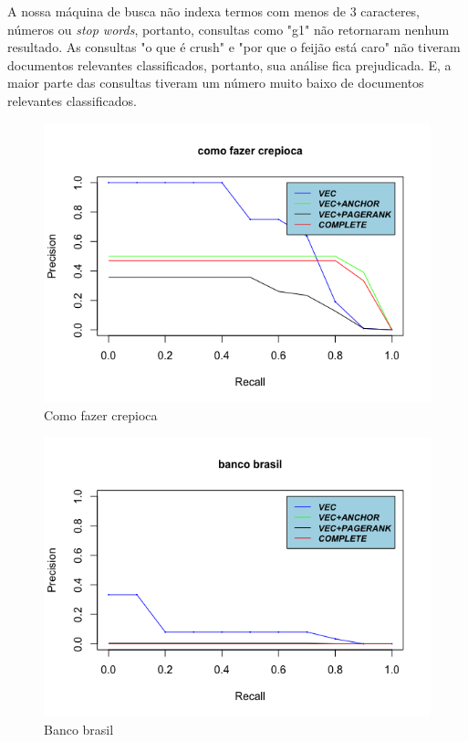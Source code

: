\documentclass{article}
\begin{document}
A nossa máquina de busca não indexa termos com menos de 3 caracteres, números ou \textit{stop words}, portanto, consultas
como "g1" não retornaram nenhum resultado. As consultas "o que é crush" e "por que o feijão está caro" não tiveram documentos
relevantes classificados, portanto, sua análise fica prejudicada. E, a maior parte das consultas tiveram um número muito baixo
de documentos relevantes classificados.

\begin{figure}
\centering
\includegraphics[width=\linewidth]{query_como_fazer_crepioca.png}
\caption{Como fazer crepioca} 
\label{fig:crepioca}
\end{figure}

\begin{figure}
\centering
\includegraphics[width=\linewidth]{query_banco_brasil.png}
\caption{Banco brasil} 
\label{fig:banco_brasil}
\end{figure}
\end{document}
